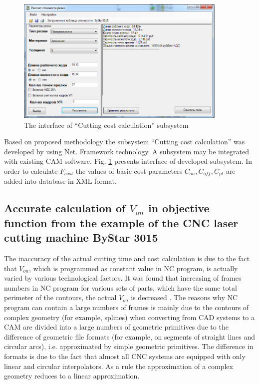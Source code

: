 \documentclass[runningheads]{llncs}
\begin{document}
\begin{figure}
  \begin{center}
  \includegraphics[width=0.9\textwidth]{app.png}
  \caption{The interface of ``Cutting cost calculation'' subsystem}
  \label{app-window}
  \end{center}
\end{figure}

Based on proposed methodology
the subsystem ``Cutting cost calculation''
was developed by using Net. Framework technology.
A subsystem may be integrated with existing CAM software.
Fig. \ref{app-window}
presents interface of developed subsystem.
In order to calculate
$F_{cost}$
the values of basic cost parameters
$C_{on}, C_{off}, C_{pt}$
are added into database in XML format.

\subsection{Accurate calculation of $V_{on}$ in objective function from the example of the CNC laser cutting machine ByStar 3015}

The inaccuracy of the actual cutting time and cost calculation is due to the fact that $V_{on}$,
which is programmed as constant value in NC program,
is actually varied by various technological factors.
It was found that increasing of frames numbers in NC program
for various sets of parts,
which have the same total perimeter of the contours,
the actual $V_{on}$ is decreased \cite{ru09,Tavaeva2015Nov}.
The reasons why NC program can contain a large numbers of frames
is mainly due to the contours of complex geometry (for example, splines)
when converting from CAD systems to a CAM
are divided into a large numbers of geometric primitives
due to the difference of geometric file formats
(for example, on segments of straight lines and circular arcs),
i.e. approximated by simple geometric primitives.
The difference in formats is due to the fact that
almost all CNC systems are equipped with only linear and circular interpolators.
As a rule the approximation of a complex geometry reduces to a linear approximation.
\end{document}
